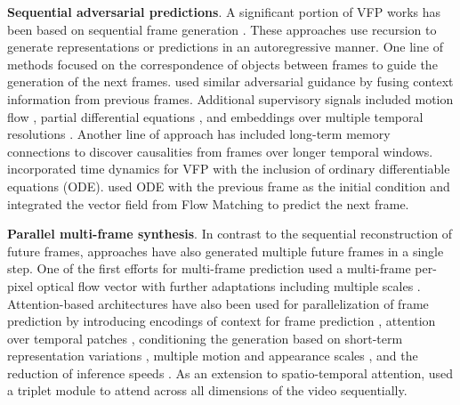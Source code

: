 \noindent
\textbf{Sequential adversarial predictions}. A significant portion of VFP works has been based on sequential frame generation \citep{castrejon2019improved,chaabane2020looking,chang2021mau,chang2022strpm,chen2017learning,guen2020disentangling,hwang2019adversarial,jin2020exploring,liang2017dual,villegas2018hierarchical,wang2018predrnn++,wu2021motionrnn}. These approaches use recursion to generate representations or predictions in an autoregressive manner. One line of methods \citep{chen2017learning,jin2017video} focused on the correspondence of objects between frames to guide the generation of the next frames. \citet{castrejon2019improved} used similar adversarial guidance by fusing context information from previous frames. Additional supervisory signals included motion flow \citep{liang2017dual}, partial differential equations \citep{guen2020disentangling}, and embeddings over multiple temporal resolutions \citep{gao2022simvp}. Another line of approach \citep{chang2021mau,villegas2018hierarchical,wang2018predrnn++} has included long-term memory connections to discover causalities from frames over longer temporal windows. \citet{park2021vid} incorporated time dynamics for VFP with the inclusion of ordinary differentiable equations (ODE). \citet{davtyan2023efficient} used ODE with the previous frame as the initial condition and integrated the vector field from Flow Matching \citep{lipman2022flow} to predict the next frame. 


\noindent
\textbf{Parallel multi-frame synthesis}. In contrast to the sequential reconstruction of future frames, approaches have also generated multiple future frames in a single step. One of the first efforts for multi-frame prediction \citep{liu2017video} used a multi-frame per-pixel optical flow vector with further adaptations including multiple scales \citep{hu2023dynamic}. Attention-based architectures have also been used for parallelization of frame prediction by introducing encodings of context for frame prediction \citep{ye2023unified}, attention over temporal patches \citep{tan2023temporal}, conditioning the generation based on short-term representation variations \citep{hu2023dynamic,smith2024convolutional}, multiple motion and appearance scales \citep{zhong2023mmvp}, and the reduction of inference speeds \citep{ye2022vptr,tang2024vmrnn}. As an extension to spatio-temporal attention, \citet{nie2024triplet} used a triplet module to attend across all dimensions of the video sequentially.

